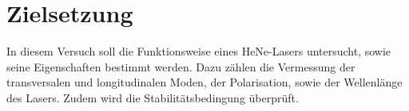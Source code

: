 \section{Zielsetzung}
\label{sec:Zielsetzung}

In diesem Versuch soll die Funktionsweise eines HeNe-Lasers untersucht, sowie seine Eigenschaften bestimmt werden. Dazu zählen die Vermessung der transversalen und longitudinalen Moden, der Polarisation, sowie der Wellenlänge des Lasers. Zudem wird die Stabilitätsbedingung überprüft.